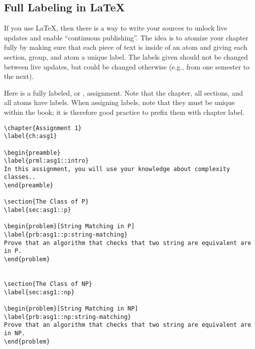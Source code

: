 \begin{note}
\section{Full Labeling in LaTeX}
\label{sec:publish::full-labeling}

\begin{gram}
If you use LaTeX, then there is a way to write your sources to unlock live updates and enable ``continuous publishing''.
%
The idea is to atomize your chapter fully by making sure that each piece of text is inside of an atom and giving each section, group, and atom a unique label.
%
The labels given should not be changed between live updates, but could be changed otherwise (e.g., from one semester to the next).
%
\end{gram}


\begin{example}

Here is a fully labeled, or , assignment.  Note that the chapter, all sections, and all atoms have labels.  When assigning labels, note that they must be unique within the book; it is therefore good practice to prefix them with chapter label.
%

\begin{lstlisting}
\chapter{Assignment 1}
\label{ch:asg1}

\begin{preamble}
\label{prml:asg1::intro}
In this assignment, you will use your knowledge about complexity classes..
\end{preamble}

\section{The Class of P}
\label{sec:asg1::p}

\begin{problem}[String Matching in P]
\label{prb:asg1::p:string-matching}
Prove that an algorithm that checks that two string are equivalent are in P.
\end{problem}


\section{The Class of NP}
\label{sec:asg1::np}

\begin{problem}[String Matching in NP]
\label{prb:asg1::np:string-matching}
Prove that an algorithm that checks that two string are equivalent are in NP.
\end{problem}



\end{lstlisting}
\end{example}
\end{note}
